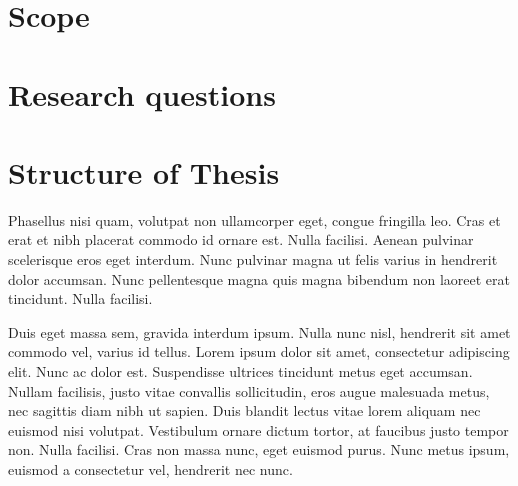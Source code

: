 \section{Scope}

\section{Research questions}

\section{Structure of Thesis}


Phasellus nisi quam, volutpat non ullamcorper eget, congue fringilla leo. Cras et erat et nibh placerat commodo id ornare est. Nulla facilisi. Aenean pulvinar scelerisque eros eget interdum. Nunc pulvinar magna ut felis varius in hendrerit dolor accumsan. Nunc pellentesque magna quis magna bibendum non laoreet erat tincidunt. Nulla facilisi.

Duis eget massa sem, gravida interdum ipsum. Nulla nunc nisl, hendrerit sit amet commodo vel, varius id tellus. Lorem ipsum dolor sit amet, consectetur adipiscing elit. Nunc ac dolor est. Suspendisse ultrices tincidunt metus eget accumsan. Nullam facilisis, justo vitae convallis sollicitudin, eros augue malesuada metus, nec sagittis diam nibh ut sapien. Duis blandit lectus vitae lorem aliquam nec euismod nisi volutpat. Vestibulum ornare dictum tortor, at faucibus justo tempor non. Nulla facilisi. Cras non massa nunc, eget euismod purus. Nunc metus ipsum, euismod a consectetur vel, hendrerit nec nunc.